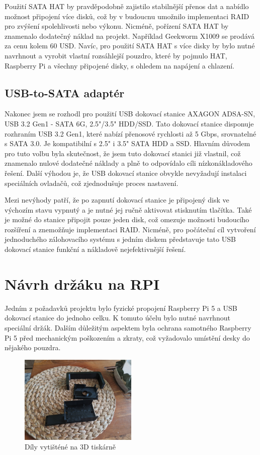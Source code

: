 \documentclass[a4paper,12pt, oneside]{book}
\begin{document}
Použití SATA HAT by pravděpodobně zajistilo stabilnější přenos dat a nabídlo
možnost připojení více disků, což by v budoucnu umožnilo implementaci RAID pro
zvýšení spolehlivosti nebo výkonu. Nicméně, pořízení SATA HAT by znamenalo
dodatečný náklad na projekt. Například Geekworm X1009 se prodává za cenu kolem
60 USD. Navíc, pro použití SATA HAT s více disky by bylo nutné navrhnout a
vyrobit vlastní rozsáhlejší pouzdro, které by pojmulo HAT, Raspberry Pi a
všechny připojené disky, s ohledem na napájení a chlazení.  


\subsection{USB-to-SATA adaptér}
Nakonec jsem se rozhodl pro použití USB dokovací stanice AXAGON ADSA-SN, USB 3.2
Gen1 - SATA 6G, 2.5"/3.5" HDD/SSD. Tato dokovací stanice
disponuje rozhraním USB 3.2 Gen1, které nabízí přenosové rychlosti až 5 Gbps,
srovnatelné s SATA 3.0. Je kompatibilní s 2.5" i 3.5" SATA HDD a SSD. Hlavním
důvodem pro tuto volbu byla skutečnost, že jsem tuto dokovací stanici již
vlastnil, což znamenalo nulové dodatečné náklady a plně to
odpovídalo cíli nízkonákladového řešení. Další výhodou je, že USB dokovací
stanice obvykle nevyžadují instalaci speciálních ovladačů,
což zjednodušuje proces nastavení.

Mezi nevýhody patří, že po zapnutí dokovací stanice je připojený disk ve
výchozím stavu vypnutý a je nutné jej ručně aktivovat stisknutím tlačítka. Také
je možné do stanice připojit pouze jeden disk, což omezuje možnosti budoucího
rozšíření a znemožňuje implementaci RAID. Nicméně, pro počáteční cíl vytvoření
jednoduchého zálohovacího systému s jedním diskem představuje tato USB dokovací
stanice funkční a nákladově nejefektivnější řešení.

\section{Návrh držáku na RPI}

Jedním z požadavků projektu bylo fyzické propojení Raspberry Pi 5 a USB dokovací
stanice do jednoho celku. K tomuto účelu bylo nutné navrhnout speciální držák.
Dalším důležitým aspektem byla ochrana samotného Raspberry Pi 5 před mechanickým
poškozením a zkraty, což vyžadovalo umístění desky do nějakého pouzdra.

\begin{figure}[h]
\caption{Díly vytišténé na 3D tiskárně}
\centering
\includegraphics[width=0.5\textwidth]{img/dily-zvlast.jpg}
\end{figure}
\end{document}
